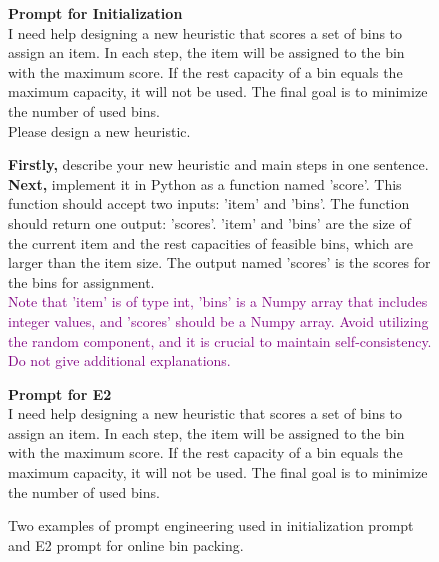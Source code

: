 \begin{figure}
    \centering
    \caption{Two examples of prompt engineering used in initialization prompt and E2 prompt for online bin packing.}
    \label{fig:prompt_bp}

\begin{minipage}{0.38\textwidth}
\small
\begin{dialogbox}
  \textbf{Prompt for Initialization} \\
  
  \textcolor {darkbrown}{ I need help designing a new heuristic that scores a set of bins to assign an item. In each step, the item will be assigned to the bin with the maximum score. If the rest capacity of a bin equals the maximum capacity, it will not be used. The final goal is to minimize the number of used bins.} \\

  Please design a new heuristic.
  
  \textbf{Firstly,} describe your \textcolor{navyblue}{new heuristic and main steps in one sentence}. \\
  \textbf{Next,} implement it in Python as a function named \textcolor{navyblue}{'score'}. This function should accept \textcolor{navyblue}{two inputs: 'item' and 'bins'}. The function should return \textcolor{navyblue}{one output: 'scores'}. \textcolor{navyblue}{'item' and 'bins' are the size of the current item and the rest capacities of feasible bins, which are larger than the item size. The output named 'scores' is the scores for the bins for assignment.}  \\

  \textcolor{purple}{Note that 'item' is of type int, 'bins' is a Numpy array that includes integer values, and 'scores' should be a Numpy array. Avoid utilizing the random component, and it is crucial to maintain self-consistency. Do not give additional explanations.}
\end{dialogbox}
\end{minipage}
\begin{minipage}{0.6\textwidth}
\small
\begin{dialogbox}
  \textbf{Prompt for E2} \\
  
  \textcolor[HTML]{8B4513}{ I need help designing a new heuristic that scores a set of bins to assign an item. In each step, the item will be assigned to the bin with the maximum score. If the rest capacity of a bin equals the maximum capacity, it will not be used. The final goal is to minimize the number of used bins.} \\


\end{dialogbox}
\end{minipage}
\end{figure}

